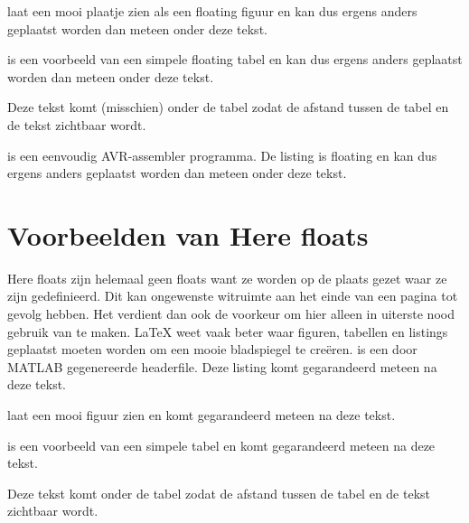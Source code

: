  laat een mooi plaatje zien als een floating figuur en kan dus ergens anders geplaatst worden dan meteen onder deze tekst.


 is een voorbeeld van een simpele floating tabel en kan dus ergens anders geplaatst worden dan meteen onder deze tekst.


Deze tekst komt (misschien) onder de tabel zodat de afstand tussen de tabel en de tekst zichtbaar wordt.

 is een eenvoudig AVR-assembler programma.
De listing is floating en kan dus ergens anders geplaatst worden dan meteen onder deze tekst.


\clearpage
\chapter{Voorbeelden van Here floats}
Here floats zijn helemaal geen floats want ze worden op de plaats gezet waar ze zijn gedefinieerd.
Dit kan ongewenste witruimte aan het einde van een pagina tot gevolg hebben.
Het verdient dan ook de voorkeur om hier alleen in uiterste nood gebruik van te maken.
\LaTeX{} weet vaak beter waar figuren, tabellen en listings geplaatst moeten worden om een mooie bladspiegel te creëren.
 is een door MATLAB gegenereerde headerfile.
Deze listing komt gegarandeerd meteen na deze tekst.


 laat een mooi figuur zien en komt gegarandeerd meteen na deze tekst.


 is een voorbeeld van een simpele tabel en komt gegarandeerd meteen na deze tekst.


Deze tekst komt onder de tabel zodat de afstand tussen de tabel en de tekst zichtbaar wordt.

